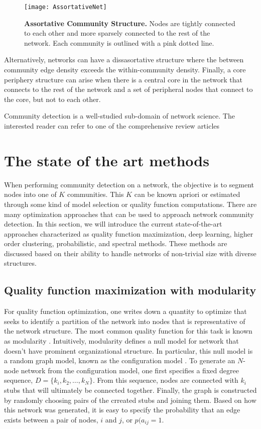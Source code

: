  \begin{figure}
\begin{center}
\texttt{[image: AssortativeNet]}
\caption{{\bf Assortative Community Structure.} Nodes are tightly connected to each other and more sparsely connected to the rest of the network. Each community is outlined with a pink dotted line.}
\label{fig:Assort}
\end{center}
\end{figure}

Alternatively, networks can have a dissasortative structure where the between community edge density exceeds the within-community density. Finally, a core periphery structure can arise when there is a central core in the network that connects to the rest of the network and a set of peripheral nodes that connect to the core, but not to each other.  

Community detection is a well-studied sub-domain of network science. The interested reader can refer to one of the comprehensive review articles \cite{fortu1,fortu2,shaicase}

\section{The state of the art methods}
When performing community detection on a network, the objective is to segment nodes into one of $K$ communities. This $K$ can be known apriori or estimated through some kind of model selection or quality function computations. There are many optimization approaches that can be used to approach network community detection. In this section, we will introduce the current state-of-the-art approaches characterized as quality function maximization, deep learning, higher order clustering, probabilistic, and spectral methods. These methods are discussed based on their ability to handle networks of non-trivial size with diverse structures.

\subsection{Quality function maximization with modularity}
\indent For quality function optimization, one writes down a quantity to optimize that seeks to identify a partition of the network into nodes that is representative of the network structure. The most common quality function for this task is known as modularity \cite{newman2006modularity}. Intuitively, modularity defines a null model for network that doesn't have prominent organizational structure. In particular, this null model is a random graph model, known as the configuration model \cite{benderCanfield}. To generate an $N$-node network from the configuration model, one first specifies a fixed degree sequence, $D=\{k_{i},k_{2},\dots,k_{N}\}$. From this sequence, nodes are connected with $k_{i}$ stubs that will ultimately be connected together. Finally, the graph is constructed by randomly choosing pairs of the crreated stubs and joining them. Based on how this network was generated, it is easy to specify the probability that an edge exists between a pair of nodes, $i$ and $j$, or $p(a_{ij}=1$.

